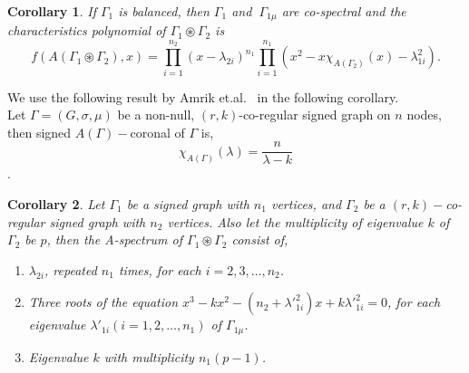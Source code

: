 \documentclass[12pt,a4paper]{article}
\newtheorem{corollary}{Corollary}[theorem]
\theoremstyle{definition}
\theoremstyle{remark}
\begin{document}
        \begin{corollary} \label{C0}
            If $\Gamma_1$ is balanced, then $\Gamma_1$ and $~\Gamma_{1\mu}$ are co-spectral and the characteristics polynomial of $\Gamma_1\circledast\Gamma_2$ is $$f(A(\Gamma_1\circledast\Gamma_2),x)=\prod_{i=1}^{n_2}(x-\lambda_{2i})^{n_1} \prod_{i=1}^{n_1}(x^2-x\chi_{A(\Gamma_2)}(x)-\lambda_{1i}^{2}).$$
        \end{corollary}
    We use the following result by Amrik et.al.~\cite{adhikari2023corona} in the following corollary.\\
     Let $\Gamma=(G,\sigma,\mu)$ be a non-null, $(r,k)$-co-regular signed graph on $n$ nodes, then signed $A(\Gamma)-$coronal of $\Gamma$ is, \[\chi_{A(\Gamma)}(\lambda)=\frac{n}{\lambda-k}\].

     \begin{corollary} \label{C1}
         Let $\Gamma_1$ be a signed graph with $n_1$ vertices, and $\Gamma_2$ be a $(r,k)-$co-regular signed graph with $n_2$ vertices. Also let the multiplicity of eigenvalue $k$ of $\Gamma_2$  be $p$, then the A-spectrum of $\Gamma_1\circledast\Gamma_2$ consist of,
         \begin{enumerate}
             \item $\lambda_{2i}$, repeated $n_1$ times, for each $i=2,3,\ldots,n_2$.
             \item Three roots of the equation $x^3-kx^2-(n_2+{\lambda'}_{1i}^2)x+k{\lambda'}_{1i}^2=0$, for each eigenvalue ${\lambda'}_{1i}(i=1,2,\ldots,n_1)$ of $\Gamma_{1\mu}$.
             \item Eigenvalue $k$ with multiplicity $n_1(p-1)$.
         \end{enumerate}
    \end{corollary}
\end{document}
